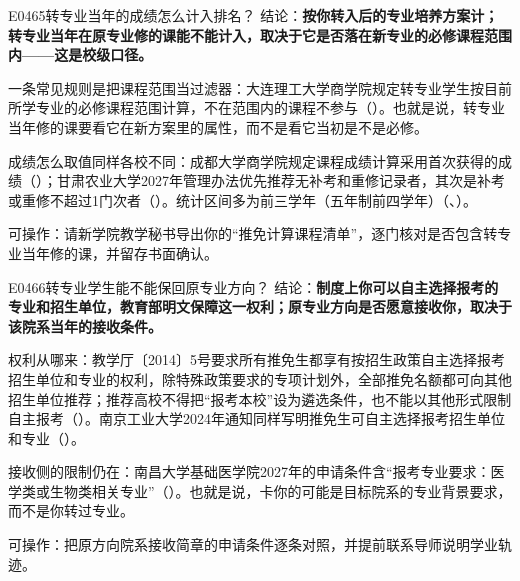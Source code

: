 \begin{qa}{E0465}{转专业当年的成绩怎么计入排名？}
结论：\textbf{按你转入后的专业培养方案计；转专业当年在原专业修的课能不能计入，取决于它是否落在新专业的必修课程范围内——这是校级口径。}

一条常见规则是把课程范围当过滤器：大连理工大学商学院规定转专业学生按目前所学专业的必修课程范围计算，不在范围内的课程不参与（）。也就是说，转专业当年修的课要看它在新方案里的属性，而不是看它当初是不是必修。

成绩怎么取值同样各校不同：成都大学商学院规定课程成绩计算采用首次获得的成绩（）；甘肃农业大学2027年管理办法优先推荐无补考和重修记录者，其次是补考或重修不超过1门次者（）。统计区间多为前三学年（五年制前四学年）（、）。

可操作：请新学院教学秘书导出你的“推免计算课程清单”，逐门核对是否包含转专业当年修的课，并留存书面确认。
\end{qa}

\begin{qa}{E0466}{转专业学生能不能保回原专业方向？}
结论：\textbf{制度上你可以自主选择报考的专业和招生单位，教育部明文保障这一权利；原专业方向是否愿意接收你，取决于该院系当年的接收条件。}

权利从哪来：教学厅〔2014〕5号要求所有推免生都享有按招生政策自主选择报考招生单位和专业的权利，除特殊政策要求的专项计划外，全部推免名额都可向其他招生单位推荐；推荐高校不得把“报考本校”设为遴选条件，也不能以其他形式限制自主报考（）。南京工业大学2024年通知同样写明推免生可自主选择报考招生单位和专业（）。

接收侧的限制仍在：南昌大学基础医学院2027年的申请条件含“报考专业要求：医学类或生物类相关专业”（）。也就是说，卡你的可能是目标院系的专业背景要求，而不是你转过专业。

可操作：把原方向院系接收简章的申请条件逐条对照，并提前联系导师说明学业轨迹。
\end{qa}

